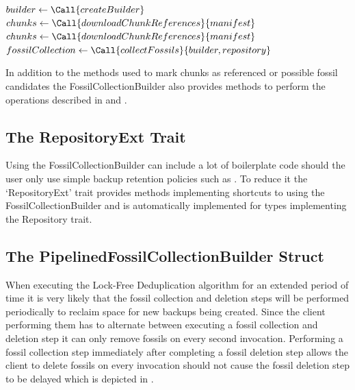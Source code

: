 \begin{algorithm}[H]
    \caption{Example of a user performing a simple fossil collection step.}\label{algo:fossil-collection}
    \begin{algorithmic}[1]
        \State $builder \gets \Call{createBuilder}$
                \State $chunks \gets \Call{downloadChunkReferences}{manifest}$
                \State {}
                \State {}
            \EndIf
        \EndFor
            \State $chunks \gets \Call{downloadChunkReferences}{manifest}$
            \State {}
        \EndFor
        \State $fossilCollection \gets \Call{collectFossils}{builder, repository}$
        \State {}
    \end{algorithmic}
\end{algorithm}

In addition to the methods used to mark chunks as referenced or possible fossil
candidates the FossilCollectionBuilder also provides methods to perform the operations
described in  and .

\subsection{The RepositoryExt Trait}

Using the FossilCollectionBuilder can include a lot of boilerplate code should
the user only use simple backup retention policies such as .
To reduce it the `RepositoryExt' trait provides methods implementing shortcuts
to using the FossilCollectionBuilder and is automatically implemented for types
implementing the Repository trait.

\subsection{The PipelinedFossilCollectionBuilder Struct}

When executing the Lock-Free Deduplication algorithm for an extended period of
time it is very likely that the fossil collection and deletion steps will be
performed periodically to reclaim space for new backups being created.
Since the client performing them has to alternate between executing a fossil
collection and deletion step it can only remove fossils on every second invocation.
Performing a fossil collection step immediately after completing a fossil deletion
step allows the client to delete fossils on every invocation should 
not cause the fossil deletion step to be delayed which is depicted in .

